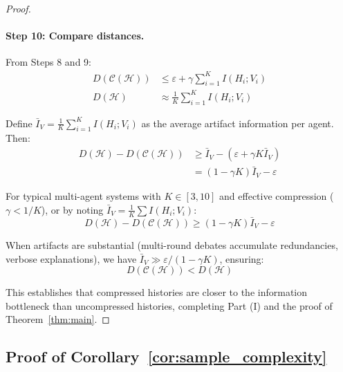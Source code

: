 \documentclass{article}
\theoremstyle{plain}
\theoremstyle{definition}
\theoremstyle{remark}
\begin{document}
\begin{proof}
\paragraph{Step 10: Compare distances.}

From Steps 8 and 9:
\begin{align}
D(\mathcal{C}(\mathcal{H})) &\leq \varepsilon + \gamma \sum_{i=1}^K I(H_i; V_i) \\
D(\mathcal{H}) &\approx \frac{1}{K}\sum_{i=1}^K I(H_i; V_i)
\end{align}

Define $\bar{I}_V = \frac{1}{K}\sum_{i=1}^K I(H_i; V_i)$ as the average artifact information per agent. Then:
\begin{align}
D(\mathcal{H}) - D(\mathcal{C}(\mathcal{H})) &\geq \bar{I}_V - (\varepsilon + \gamma K \bar{I}_V) \\
&= (1 - \gamma K) \bar{I}_V - \varepsilon
\end{align}

For typical multi-agent systems with $K \in [3, 10]$ and effective compression ($\gamma < 1/K$), or by noting $\bar{I}_V = \frac{1}{K}\sum I(H_i; V_i)$:
\begin{equation}
D(\mathcal{H}) - D(\mathcal{C}(\mathcal{H})) \geq (1-\gamma K) \bar{I}_V - \varepsilon
\end{equation}

When artifacts are substantial (multi-round debates accumulate redundancies, verbose explanations), we have $\bar{I}_V \gg \varepsilon/(1-\gamma K)$, ensuring:
\begin{equation}
D(\mathcal{C}(\mathcal{H})) < D(\mathcal{H})
\end{equation}

This establishes that compressed histories are closer to the information bottleneck than uncompressed histories, completing Part (I) and the proof of Theorem~\ref{thm:main}.

\end{proof}

\subsection{Proof of Corollary~\ref{cor:sample_complexity}}
\end{document}
